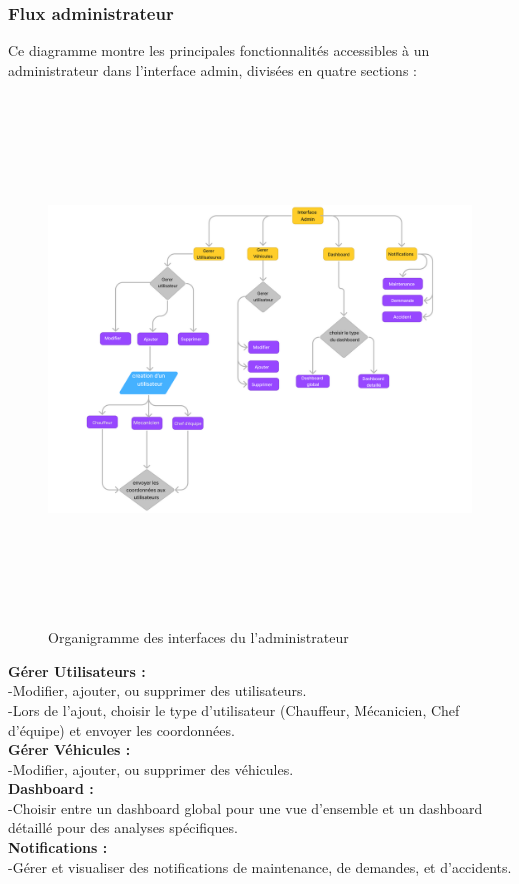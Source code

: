 \subsubsection{Flux administrateur}
Ce diagramme montre les principales fonctionnalités accessibles à un administrateur dans l'interface admin, divisées en quatre sections :
\begin{figure}[htbp]
  \centering
  \includegraphics[width=1\textwidth,height=14cm]{chap2.images/org admin2.png}
  \caption{Organigramme des interfaces du l'administrateur }
\end{figure}

\noindent
\textbf{Gérer Utilisateurs :}\\
-Modifier, ajouter, ou supprimer des utilisateurs.\\
-Lors de l'ajout, choisir le type d'utilisateur (Chauffeur, Mécanicien, Chef d'équipe) et envoyer les coordonnées.\\
\textbf{Gérer Véhicules :}\\
-Modifier, ajouter, ou supprimer des véhicules.\\
\textbf{Dashboard :}\\
-Choisir entre un dashboard global pour une vue d'ensemble et un dashboard détaillé pour des analyses spécifiques.\\
\textbf{Notifications :}\\
-Gérer et visualiser des notifications de maintenance, de demandes, et d'accidents.\\

